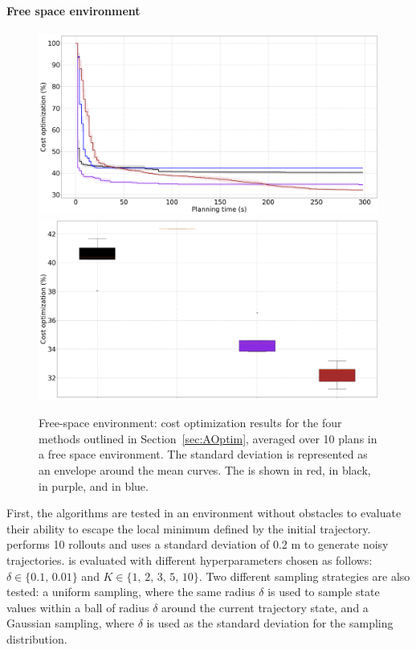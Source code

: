 \paragraph{Free space environment}

\begin{figure} [h!]
    \centering
    \includegraphics[width=0.8\linewidth]{figures/accuracy/all_methods_empty.png} \\
    \includegraphics[width=0.8\linewidth]{figures/accuracy/bplot_all_methods_empty.png}
    \caption{Free-space environment: cost optimization results for the four methods outlined in Section~\ref{sec:AOptim}, averaged over 10 plans in a free space environment. 
    The standard deviation is represented as an envelope around the mean curves.
    The  is shown in red,  in black,  in purple, and  in blue.}%
    \label{fig:acc_empty}%
\end{figure}

First, the algorithms are tested in an environment without obstacles to evaluate their ability to escape the local minimum defined by the initial trajectory.
 performs 10 rollouts and uses a standard deviation of 0.2 m to generate noisy trajectories.
 is evaluated with different hyperparameters chosen as follows: $\delta \in \{0.1, \, 0.01\}$ and $K \in \{1, \, 2, \, 3, \, 5, \, 10\}$.
Two different sampling strategies are also tested: a uniform sampling, where the same radius $\delta$ is used to sample state values within a ball of radius $\delta$ around the current trajectory state, and a Gaussian sampling, where $\delta$ is used as the standard deviation for the sampling distribution.

